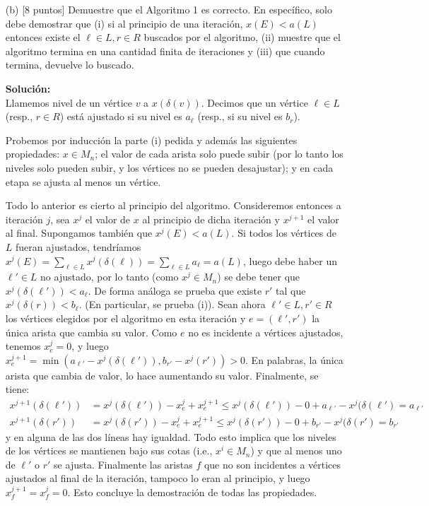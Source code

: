 \documentclass{article}
\theoremstyle{plain}
\theoremstyle{definition}
\theoremstyle{Azul}
\begin{document}
\begin{enumerate}
\item[(b)] [8 puntos] Demuestre que el Algoritmo 1 es correcto. En específico, solo debe demostrar que (i) si al principio de una iteración, $x(E)< a(L)$ entonces existe el $\ell \in L, r\in R$ buscados por el algoritmo, (ii) muestre que el algoritmo termina en una cantidad finita de iteraciones y (iii) que cuando termina, devuelve lo buscado.

\textbf{Solución:}\\
Llamemos nivel de un vértice $v$ a $x(\delta(v))$. Decimos que un vértice $\ell\in L$ (resp., $r\in R$) está ajustado si su nivel es $a_\ell$ (resp., si su nivel es $b_r$). 

Probemos por inducción la parte (i) pedida y además las siguientes propiedades: $x\in M_n$; el valor de cada arista solo puede subir (por lo tanto los niveles solo pueden subir, y los vértices no se pueden desajustar); y en cada etapa se ajusta al menos un vértice. 

Todo lo anterior es cierto al principio del algoritmo. Consideremos entonces a iteración $j$, sea $x^j$ el valor de $x$ al principio de dicha iteración y $x^{j+1}$ el valor al final. Supongamos también que $x^{j}(E)<a(L)$. Si todos los vértices de $L$ fueran ajustados, tendríamos  $x^j(E)=\sum_{\ell\in L}x^{j}(\delta(\ell))=\sum_{\ell\in L}a_\ell = a(L)$, luego debe haber un $\ell'\in L$ no ajustado, por lo tanto (como $x^{j}\in M_n$) se debe tener que $x^j(\delta(\ell'))<a_\ell$. De forma análoga se prueba que existe $r'$ tal que  $x^{j}(\delta(r))<b_\ell$. (En particular, se prueba (i)). Sean ahora $\ell'\in L, r'\in R$ los vértices elegidos por el algoritmo en esta iteración y $e=(\ell',r')$ la única arista que cambia su valor. Como $e$ no es incidente a vértices ajustados, tenemos $x^j_e=0$, y luego $x^{j+1}_{e}= \min(a_{\ell'}-x^{j}(\delta(\ell')), b_{r'}-x^{j}(r')) >0$. En palabras, la única arista que cambia de valor, lo hace aumentando su valor. Finalmente, se tiene:
\begin{align*}
x^{j+1}(\delta(\ell'))&=x^j(\delta(\ell'))-x^{j}_e+x^{j+1}_e\leq x^{j}(\delta(\ell'))-0+a_{\ell'}-x^{j}(\delta(\ell')=a_{\ell'}\\
x^{j+1}(\delta(r'))&=x^j(\delta(r'))-x^{j}_e+x^{j+1}_e\leq x^{j}(\delta(r'))-0+b_{r'}-x^{j}(\delta(r')=b_{r'}
\end{align*}
y en alguna de las dos líneas hay igualdad. Todo esto implica que los niveles de los vértices se mantienen bajo sus cotas (i.e., $x^i\in M_n$) y que al menos uno de $\ell'$ o $r'$ se ajusta. Finalmente las aristas $f$ que  no son incidentes a vértices ajustados al final de la iteración, tampoco lo eran al principio, y luego $x^{j+1}_f=x^j_f=0$. Esto concluye la demostración de todas las propiedades.


\end{enumerate}
\end{document}
